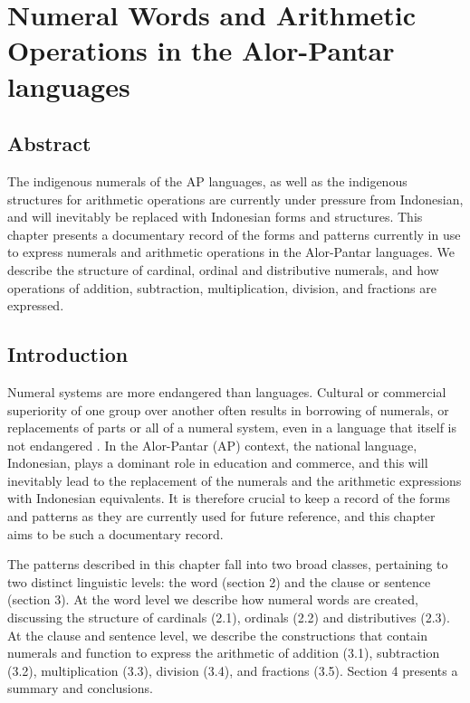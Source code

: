 
\chapter{Numeral Words and Arithmetic Operations in the Alor-Pantar languages}

\section*{Abstract} The indigenous numerals of the AP languages, as well as the indigenous structures for arithmetic operations are currently under pressure from Indonesian, and will inevitably be replaced with Indonesian forms and structures. This chapter presents a documentary record of the forms and patterns currently in use to express numerals and arithmetic operations in the Alor-Pantar languages. We describe the structure of cardinal, ordinal and distributive numerals, and how operations of addition, subtraction, multiplication, division, and fractions are expressed.

\section{Introduction}
\hypertarget{Toc376958929}{}Numeral systems are more endangered than languages. Cultural or commercial superiority of one group over another often results in borrowing of numerals, or replacements of parts or all of a numeral system, even in a language that itself is not endangered \citep{Comrie2005numsys}. In the Alor-Pantar (AP) context, the national language, Indonesian, plays a dominant role in education and commerce, and this will inevitably lead to the replacement of the numerals and the arithmetic expressions with Indonesian equivalents. It is therefore crucial to keep a record of the forms and patterns as they are currently used for future reference, and this chapter aims to be such a documentary record.

The patterns described in this chapter fall into two broad classes, pertaining to two distinct linguistic levels: the word (section 2) and the clause or sentence (section 3). At the word level we describe how numeral words are created, discussing the structure of cardinals (2.1), ordinals (2.2) and distributives (2.3). At the clause and sentence level, we describe the constructions that contain numerals and function to express the arithmetic of addition (3.1), subtraction (3.2), multiplication (3.3), division (3.4), and fractions (3.5). Section 4 presents a summary and conclusions.

